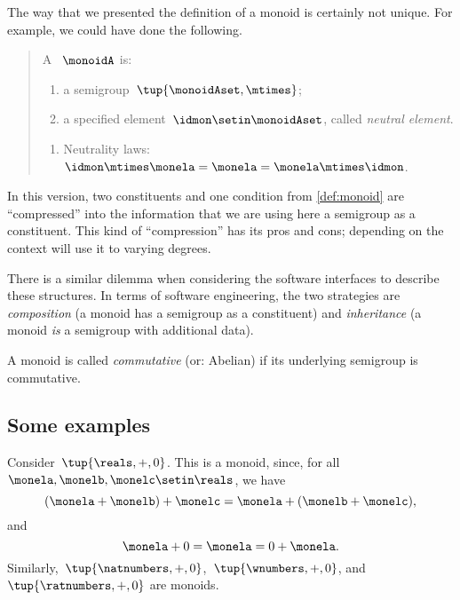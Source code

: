 \begin{remark}
    The way that we presented the definition of a monoid is certainly not unique.
    For example, we could have done the following.
    \begin{quote}
        A \emph{}~$\monoidA$ is:
        \begin{body}
            \constit
            \begin{enumerate}
                \item a semigroup~$\tup{\monoidAset, \mtimes}$;
                \item a specified element~$\idmon\setin \monoidAset$, called \emph{neutral element}.
            \end{enumerate}
            \condit
            \begin{enumerate}
                \item Neutrality laws:~$\idmon\mtimes \monela= \monela= \monela \mtimes \idmon$.
            \end{enumerate}
        \end{body}
    \end{quote}
    In this version, two constituents and one condition from \cref{def:monoid} are ``compressed'' into the information that we are using here a semigroup as a constituent.
    This kind of ``compression'' has its pros and cons; depending on the context will use it to varying degrees.

    There is a similar dilemma when considering the software interfaces to describe these structures.
    In terms of software engineering, the two strategies are \emph{composition} (a monoid has a semigroup as a constituent) and \emph{inheritance} (a monoid \emph{is} a semigroup with additional data).

\end{remark}

\begin{remark}
    A monoid is called \emph{commutative} (or: Abelian) if its underlying semigroup is commutative.
\end{remark}

\subsection{Some examples}

\begin{example}
    Consider~$\tup{\reals,+,0}$.
    This is a monoid, since, for all~$\monela,\monelb, \monelc \setin \reals$, we have
    \begin{equation}
        (\monela+\monelb)
        +\monelc=\monela+(\monelb+\monelc),
    \end{equation}
    and
    \begin{equation}
        \monela+0=\monela=0+\monela.
    \end{equation}
    Similarly,~$\tup{\natnumbers, +,0}$,~$\tup{\wnumbers, +,0}$, and~$\tup{\ratnumbers, +,0}$ are monoids.
\end{example}


